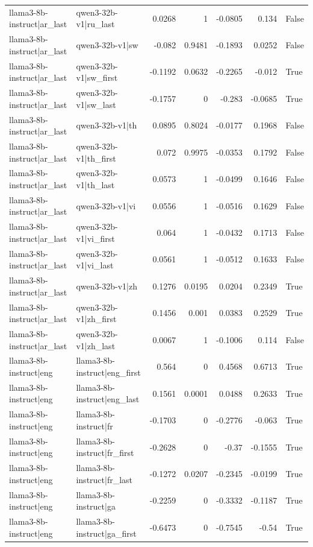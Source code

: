 \begin{table}
\begin{tabular}{l l r r r r l}
llama3-8b-instruct|ar_last & qwen3-32b-v1|ru_last & 0.0268 & 1 & -0.0805 & 0.134 & False \\
llama3-8b-instruct|ar_last & qwen3-32b-v1|sw & -0.082 & 0.9481 & -0.1893 & 0.0252 & False \\
llama3-8b-instruct|ar_last & qwen3-32b-v1|sw_first & -0.1192 & 0.0632 & -0.2265 & -0.012 & True \\
llama3-8b-instruct|ar_last & qwen3-32b-v1|sw_last & -0.1757 & 0 & -0.283 & -0.0685 & True \\
llama3-8b-instruct|ar_last & qwen3-32b-v1|th & 0.0895 & 0.8024 & -0.0177 & 0.1968 & False \\
llama3-8b-instruct|ar_last & qwen3-32b-v1|th_first & 0.072 & 0.9975 & -0.0353 & 0.1792 & False \\
llama3-8b-instruct|ar_last & qwen3-32b-v1|th_last & 0.0573 & 1 & -0.0499 & 0.1646 & False \\
llama3-8b-instruct|ar_last & qwen3-32b-v1|vi & 0.0556 & 1 & -0.0516 & 0.1629 & False \\
llama3-8b-instruct|ar_last & qwen3-32b-v1|vi_first & 0.064 & 1 & -0.0432 & 0.1713 & False \\
llama3-8b-instruct|ar_last & qwen3-32b-v1|vi_last & 0.0561 & 1 & -0.0512 & 0.1633 & False \\
llama3-8b-instruct|ar_last & qwen3-32b-v1|zh & 0.1276 & 0.0195 & 0.0204 & 0.2349 & True \\
llama3-8b-instruct|ar_last & qwen3-32b-v1|zh_first & 0.1456 & 0.001 & 0.0383 & 0.2529 & True \\
llama3-8b-instruct|ar_last & qwen3-32b-v1|zh_last & 0.0067 & 1 & -0.1006 & 0.114 & False \\
llama3-8b-instruct|eng & llama3-8b-instruct|eng_first & 0.564 & 0 & 0.4568 & 0.6713 & True \\
llama3-8b-instruct|eng & llama3-8b-instruct|eng_last & 0.1561 & 0.0001 & 0.0488 & 0.2633 & True \\
llama3-8b-instruct|eng & llama3-8b-instruct|fr & -0.1703 & 0 & -0.2776 & -0.063 & True \\
llama3-8b-instruct|eng & llama3-8b-instruct|fr_first & -0.2628 & 0 & -0.37 & -0.1555 & True \\
llama3-8b-instruct|eng & llama3-8b-instruct|fr_last & -0.1272 & 0.0207 & -0.2345 & -0.0199 & True \\
llama3-8b-instruct|eng & llama3-8b-instruct|ga & -0.2259 & 0 & -0.3332 & -0.1187 & True \\
llama3-8b-instruct|eng & llama3-8b-instruct|ga_first & -0.6473 & 0 & -0.7545 & -0.54 & True \\

\end{tabular}
\end{table}

